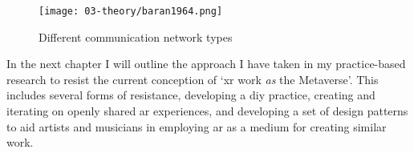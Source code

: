 \begin{figure}[ht]
    \centering
    \texttt{[image: 03-theory/baran1964.png]}
    \captionsetup{justification=centering,margin=1.5cm}
    \caption{Different communication network types \citep[in][]{baran1964}}\label{fig: baran1964}
\end{figure}


In the next chapter I will outline the approach I have taken in my practice-based research to resist the current conception of `\gls{xr} work \textit{as} the Metaverse'. This includes several forms of resistance, developing a \gls{diy} practice, creating and iterating on openly shared \gls{ar} experiences, and developing a set of design patterns to aid artists and musicians in employing \gls{ar} as a medium for creating similar work.